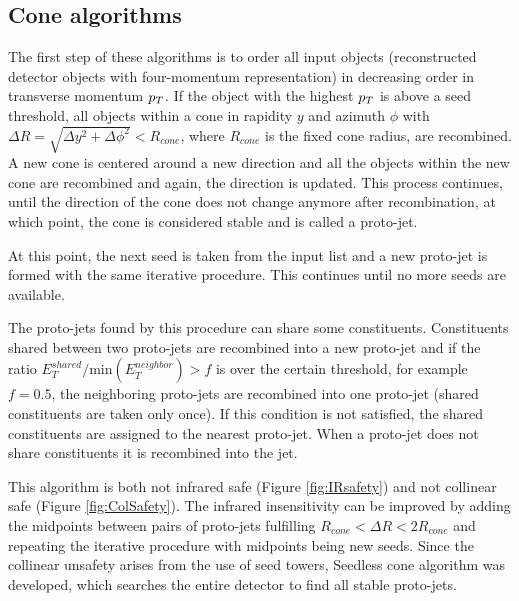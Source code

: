 \subsection{Cone algorithms}

The first step of these algorithms is to order all input objects (reconstructed
detector objects with four-momentum representation) in decreasing order in
transverse momentum $p_{T}$. If the object with the highest $p_{T}$ is above a
seed threshold, all objects within a cone in rapidity $y$ and azimuth
$\phi$ with $\Delta R = \sqrt{\Delta y^2 + \Delta \phi^2} < R_{cone}$, where
$R_{cone}$ is the fixed cone radius, are recombined.
A new cone is centered around a new direction and all the objects within the new
cone are recombined and again, the direction is updated. This process continues,
until the direction of the cone does not change anymore after recombination, at
which point, the cone is considered stable and is called a proto-jet. 

At this point, the next seed is taken from the input list and a new proto-jet is
formed with the same iterative procedure. This continues until no more seeds are
available. 

The proto-jets found by this procedure can share some constituents. Constituents
shared between two proto-jets are recombined into a new proto-jet and if the ratio
$E_T^{shared} / \text{min} ( E_T^{neighbor} ) > f$ is over the certain
threshold, for example $f = 0.5$, the neighboring proto-jets are recombined into
one proto-jet (shared constituents are taken only once). If this condition is
not satisfied, the shared constituents are assigned to the nearest proto-jet.
When a proto-jet does not share constituents it is recombined into the jet.

This algorithm is both not infrared safe (Figure \ref{fig:IRsafety}) and not
collinear safe (Figure \ref{fig:ColSafety}). The infrared insensitivity can be
improved by adding the midpoints between pairs of proto-jets fulfilling
$R_{cone} < \Delta R < 2 R_{cone}$ and repeating the iterative procedure with
midpoints being new seeds. Since the collinear unsafety arises from the use of
seed towers, Seedless cone algorithm was developed, which searches the entire
detector to find all stable proto-jets.

